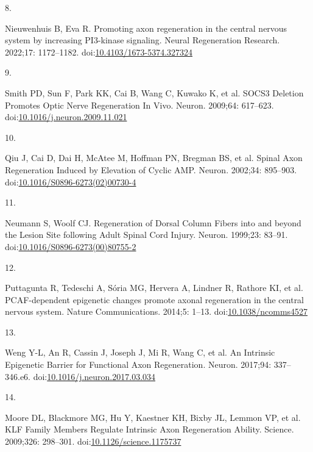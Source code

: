 \documentclass[
  12pt,
  a4paper,
]{book}
\newlength{\cslhangindent}
\newlength{\csllabelwidth}
\newlength{\cslentryspacingunit} %
\newenvironment{CSLReferences}[2] %
 {%
  \setlength{\parindent}{0pt}
  \ifodd #1
  \let\oldpar\par
  \def\par{\hangindent=\cslhangindent\oldpar}
  \fi
  \setlength{\parskip}{#2\cslentryspacingunit}
 }%
 {}
\newcommand{\CSLLeftMargin}[1]{\parbox[t]{\csllabelwidth}{#1}}
\newcommand{\CSLRightInline}[1]{\parbox[t]{\linewidth - \csllabelwidth}{#1}\break}
\begin{document}
\begin{CSLReferences}{0}{0}
\leavevmode{}%
\CSLLeftMargin{8. }%
\CSLRightInline{Nieuwenhuis B, Eva R. Promoting axon regeneration in the central nervous system by increasing {PI3-kinase} signaling. Neural Regeneration Research. 2022;17: 1172--1182. doi:\href{https://doi.org/10.4103/1673-5374.327324}{10.4103/1673-5374.327324}}

\leavevmode{}%
\CSLLeftMargin{9. }%
\CSLRightInline{Smith PD, Sun F, Park KK, Cai B, Wang C, Kuwako K, et al. {SOCS3 Deletion Promotes Optic Nerve Regeneration In Vivo}. Neuron. 2009;64: 617--623. doi:\href{https://doi.org/10.1016/j.neuron.2009.11.021}{10.1016/j.neuron.2009.11.021}}

\leavevmode{}%
\CSLLeftMargin{10. }%
\CSLRightInline{Qiu J, Cai D, Dai H, McAtee M, Hoffman PN, Bregman BS, et al. Spinal {Axon Regeneration Induced} by {Elevation} of {Cyclic AMP}. Neuron. 2002;34: 895--903. doi:\href{https://doi.org/10.1016/S0896-6273(02)00730-4}{10.1016/S0896-6273(02)00730-4}}

\leavevmode{}%
\CSLLeftMargin{11. }%
\CSLRightInline{Neumann S, Woolf CJ. Regeneration of {Dorsal Column Fibers} into and beyond the {Lesion Site} following {Adult Spinal Cord Injury}. Neuron. 1999;23: 83--91. doi:\href{https://doi.org/10.1016/S0896-6273(00)80755-2}{10.1016/S0896-6273(00)80755-2}}

\leavevmode{}%
\CSLLeftMargin{12. }%
\CSLRightInline{Puttagunta R, Tedeschi A, Sória MG, Hervera A, Lindner R, Rathore KI, et al. {PCAF-dependent} epigenetic changes promote axonal regeneration in the central nervous system. Nature Communications. 2014;5: 1--13. doi:\href{https://doi.org/10.1038/ncomms4527}{10.1038/ncomms4527}}

\leavevmode{}%
\CSLLeftMargin{13. }%
\CSLRightInline{Weng Y-L, An R, Cassin J, Joseph J, Mi R, Wang C, et al. An {Intrinsic Epigenetic Barrier} for {Functional Axon Regeneration}. Neuron. 2017;94: 337--346.e6. doi:\href{https://doi.org/10.1016/j.neuron.2017.03.034}{10.1016/j.neuron.2017.03.034}}

\leavevmode{}%
\CSLLeftMargin{14. }%
\CSLRightInline{Moore DL, Blackmore MG, Hu Y, Kaestner KH, Bixby JL, Lemmon VP, et al. {KLF Family Members Regulate Intrinsic Axon Regeneration Ability}. Science. 2009;326: 298--301. doi:\href{https://doi.org/10.1126/science.1175737}{10.1126/science.1175737}}


\end{CSLReferences}
\end{document}
